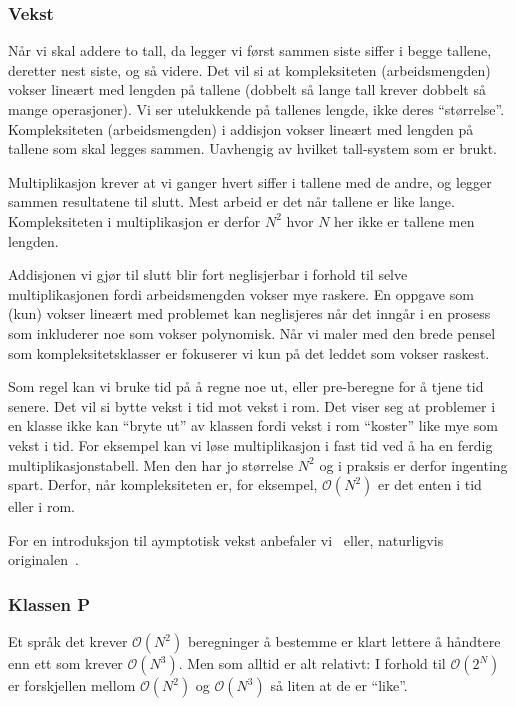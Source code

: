 \documentclass[a4paper, parskip=half]{scrartcl}
\theoremstyle{definition}
\begin{document}
\subsubsection{Vekst}

Når vi skal addere to tall, da legger vi først sammen siste siffer i
begge tallene, deretter nest siste, og så videre.  Det vil si at
kompleksiteten (arbeidsmengden) vokser lineært med lengden på tallene
(dobbelt så lange 
tall krever dobbelt så mange operasjoner).  Vi ser utelukkende på
tallenes lengde, ikke deres ``størrelse''.  Kompleksiteten
(arbeidsmengden) i addisjon vokser lineært med lengden på tallene som
skal legges sammen.  Uavhengig av hvilket tall-system som er brukt.

Multiplikasjon krever at vi ganger hvert siffer i tallene med
de andre, og legger sammen resultatene til slutt.  Mest arbeid er det
når tallene er like lange.  Kompleksiteten i multiplikasjon er derfor
${N}^2$ hvor $N$ her ikke er tallene men lengden.

Addisjonen vi gjør  til slutt blir fort neglisjerbar i forhold til
selve multiplikasjonen fordi arbeidsmengden vokser mye raskere.  En
oppgave som (kun) vokser lineært med problemet kan neglisjeres når det 
inngår i en prosess som inkluderer noe som vokser polynomisk.  Når vi
maler med den brede pensel som kompleksitetsklasser er fokuserer vi
kun på det leddet som vokser raskest.

Som regel kan vi bruke tid på å regne noe ut, eller pre-beregne for å
tjene tid senere.  Det vil si bytte vekst i tid mot vekst i rom.  Det
viser seg at problemer i en klasse ikke kan ``bryte ut'' av klassen
fordi vekst i rom ``koster'' like mye som vekst i tid.  For eksempel
kan vi løse multiplikasjon i fast tid ved å ha en ferdig
multiplikasjonstabell.  Men den har jo størrelse $N^2$ og i praksis er
derfor ingenting spart.  Derfor, når kompleksiteten er, for eksempel,
$\mathcal{O}(N^2)$ er det enten i tid eller i rom.

For en introduksjon til aymptotisk vekst anbefaler
vi~\cite{graham1994concrete} eller, naturligvis
originalen~\cite{knuth1997art1}. 


\subsubsection{Klassen P}

Et språk det krever $\mathcal{O}(N^2)$ beregninger å bestemme er klart
lettere å 
håndtere enn ett som krever $\mathcal{O}(N^3)$.  Men som alltid er alt
relativt: 
I forhold til $\mathcal{O}(2^N)$ er forskjellen mellom
$\mathcal{O}(N^2)$ og $\mathcal{O}(N^3)$ 
så liten at de er ``like''.
\end{document}
